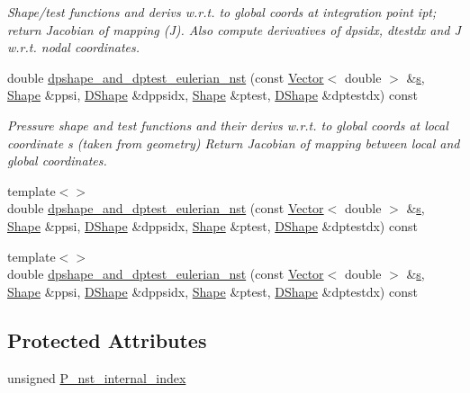 \begin{DoxyCompactItemize}
\begin{DoxyCompactList}\small\item\em Shape/test functions and derivs w.\+r.\+t. to global coords at integration point ipt; return Jacobian of mapping (J). Also compute derivatives of dpsidx, dtestdx and J w.\+r.\+t. nodal coordinates. \end{DoxyCompactList}\item 
double \hyperlink{classoomph_1_1TCrouzeixRaviartElement_ac724277861641753d731cac5202f0f2c}{dpshape\+\_\+and\+\_\+dptest\+\_\+eulerian\+\_\+nst} (const \hyperlink{classoomph_1_1Vector}{Vector}$<$ double $>$ \&\hyperlink{cfortran_8h_ab7123126e4885ef647dd9c6e3807a21c}{s}, \hyperlink{classoomph_1_1Shape}{Shape} \&ppsi, \hyperlink{classoomph_1_1DShape}{D\+Shape} \&dppsidx, \hyperlink{classoomph_1_1Shape}{Shape} \&ptest, \hyperlink{classoomph_1_1DShape}{D\+Shape} \&dptestdx) const
\begin{DoxyCompactList}\small\item\em Pressure shape and test functions and their derivs w.\+r.\+t. to global coords at local coordinate s (taken from geometry) Return Jacobian of mapping between local and global coordinates. \end{DoxyCompactList}\item 
{\footnotesize template$<$$>$ }\\double \hyperlink{classoomph_1_1TCrouzeixRaviartElement_a399c7fe8c79d8954edd98823a776e7b7}{dpshape\+\_\+and\+\_\+dptest\+\_\+eulerian\+\_\+nst} (const \hyperlink{classoomph_1_1Vector}{Vector}$<$ double $>$ \&\hyperlink{cfortran_8h_ab7123126e4885ef647dd9c6e3807a21c}{s}, \hyperlink{classoomph_1_1Shape}{Shape} \&ppsi, \hyperlink{classoomph_1_1DShape}{D\+Shape} \&dppsidx, \hyperlink{classoomph_1_1Shape}{Shape} \&ptest, \hyperlink{classoomph_1_1DShape}{D\+Shape} \&dptestdx) const
\item 
{\footnotesize template$<$$>$ }\\double \hyperlink{classoomph_1_1TCrouzeixRaviartElement_a2fc4b14aa6bc8c93f2df151c42f2beef}{dpshape\+\_\+and\+\_\+dptest\+\_\+eulerian\+\_\+nst} (const \hyperlink{classoomph_1_1Vector}{Vector}$<$ double $>$ \&\hyperlink{cfortran_8h_ab7123126e4885ef647dd9c6e3807a21c}{s}, \hyperlink{classoomph_1_1Shape}{Shape} \&ppsi, \hyperlink{classoomph_1_1DShape}{D\+Shape} \&dppsidx, \hyperlink{classoomph_1_1Shape}{Shape} \&ptest, \hyperlink{classoomph_1_1DShape}{D\+Shape} \&dptestdx) const
\end{DoxyCompactItemize}
\subsection*{Protected Attributes}
\begin{DoxyCompactItemize}
\item 
unsigned \hyperlink{classoomph_1_1TCrouzeixRaviartElement_a2cbeaf78ee0aeef8308c7356563edcdf}{P\+\_\+nst\+\_\+internal\+\_\+index}
\end{DoxyCompactItemize}
